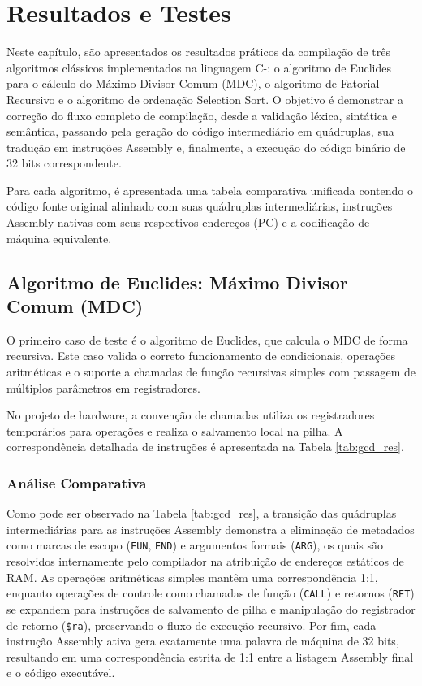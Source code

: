\chapter{Resultados e Testes}
\label{chap:resultados}

Neste capítulo, são apresentados os resultados práticos da compilação de três algoritmos clássicos implementados na linguagem C-: o algoritmo de Euclides para o cálculo do Máximo Divisor Comum (MDC), o algoritmo de Fatorial Recursivo e o algoritmo de ordenação Selection Sort. O objetivo é demonstrar a correção do fluxo completo de compilação, desde a validação léxica, sintática e semântica, passando pela geração do código intermediário em quádruplas, sua tradução em instruções Assembly e, finalmente, a execução do código binário de 32 bits correspondente.

Para cada algoritmo, é apresentada uma tabela comparativa unificada contendo o código fonte original alinhado com suas quádruplas intermediárias, instruções Assembly nativas com seus respectivos endereços (PC) e a codificação de máquina equivalente.

\section{Algoritmo de Euclides: Máximo Divisor Comum (MDC)}
\label{sec:res_gcd}

O primeiro caso de teste é o algoritmo de Euclides, que calcula o MDC de forma recursiva. Este caso valida o correto funcionamento de condicionais, operações aritméticas e o suporte a chamadas de função recursivas simples com passagem de múltiplos parâmetros em registradores.

No projeto de hardware, a convenção de chamadas utiliza os registradores temporários para operações e realiza o salvamento local na pilha. A correspondência detalhada de instruções é apresentada na Tabela \ref{tab:gcd_res}.

\subsection{Análise Comparativa}
Como pode ser observado na Tabela \ref{tab:gcd_res}, a transição das quádruplas intermediárias para as instruções Assembly demonstra a eliminação de metadados como marcas de escopo (\texttt{FUN}, \texttt{END}) e argumentos formais (\texttt{ARG}), os quais são resolvidos internamente pelo compilador na atribuição de endereços estáticos de RAM. As operações aritméticas simples mantêm uma correspondência 1:1, enquanto operações de controle como chamadas de função (\texttt{CALL}) e retornos (\texttt{RET}) se expandem para instruções de salvamento de pilha e manipulação do registrador de retorno (\texttt{\$ra}), preservando o fluxo de execução recursivo. Por fim, cada instrução Assembly ativa gera exatamente uma palavra de máquina de 32 bits, resultando em uma correspondência estrita de 1:1 entre a listagem Assembly final e o código executável.

